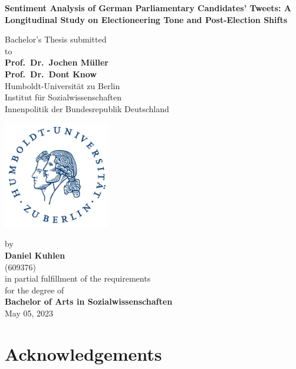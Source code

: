 \documentclass[a4paper,11pt]{article}
\begin{document}
\thispagestyle{empty}
\begin{center}
  {\Large{\bf Sentiment Analysis of German Parliamentary Candidates' Tweets:
A Longitudinal Study on Electioneering Tone and Post-Election Shifts}} \vspace{0.5cm}

  Bachelor's Thesis submitted \\\vspace{0.5cm}
  to \\\vspace{0.5cm}
  \textbf{Prof.~Dr.~Jochen Müller} \\
  \textbf{Prof.~Dr.~Dont Know} \\\vspace{0.5cm}
  Humboldt-Universität zu Berlin \\
  Institut für Sozialwissenschaften \\
  Innenpolitik der Bundesrepublik Deutschland \\
   \vspace{1cm}

  \includegraphics[width=0.35\textwidth]{HU_Logo_small.png}
  
  by \\\vspace{0.5cm}
  \textbf{Daniel Kuhlen} \\
  (609376) \\
  
  \medskip
  \medskip
  in partial fulfillment of the requirements \\
  for the degree of \\
  \textbf{Bachelor of Arts in Sozialwissenschaften} \\\vspace{0.5cm}
  May 05, 2023
  
\end{center}
\newpage
\hypertarget{acknowledgements}{%
\section*{Acknowledgements}\label{acknowledgements}}
\end{document}
